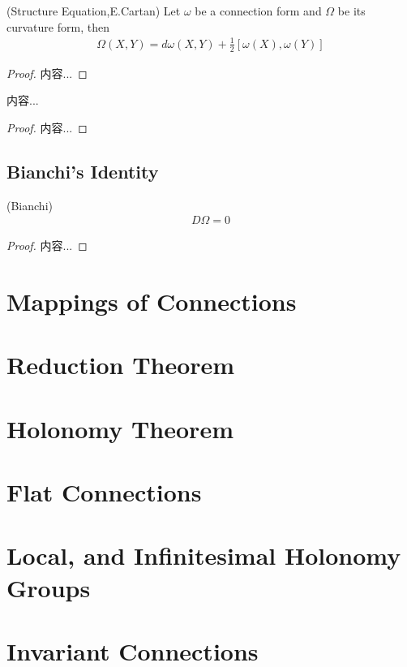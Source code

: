 \documentclass[Total.tex]{subfiles}
\begin{document}
				\begin{theorem}
					(Structure Equation,E.Cartan) Let $\omega$ be a connection form and $\Omega$ be its curvature form, then
					\begin{gather*}
						\Omega(X,Y)=d\omega(X,Y)+\frac{1}{2}[\omega(X),\omega(Y)]
					\end{gather*}
				\end{theorem}
				\begin{proof}
					内容...
				\end{proof}
				
				\begin{proposition}
					内容...
				\end{proposition}
				\begin{proof}
					内容...
				\end{proof}
				
				\subsection{Bianchi's Identity}
				
				\begin{theorem}
					(Bianchi)
					\begin{gather*}
						D\Omega=0
					\end{gather*}
				\end{theorem}
				\begin{proof}
					内容...
				\end{proof}
		\section{Mappings of Connections}
		\section{Reduction Theorem}
		\section{Holonomy Theorem}
		\section{Flat Connections}
		\section{Local, and Infinitesimal Holonomy Groups}
		\section{Invariant Connections}
\end{document}
